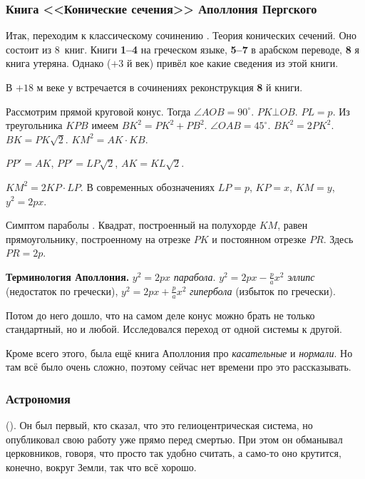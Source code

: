 \documentclass[a4paper,oneside,fleqn,10pt]{article}
\begin{document}
\subsubsection{Книга <<Конические сечения>> Аполлония Пергского}

Итак, переходим к классическому сочинению
. Теория конических сечений.  Оно состоит
из 8~книг. Книги \textbf{1--4} на греческом языке, \textbf{5--7} в
арабском переводе, \textbf{8} я книга утеряна.  Однако 
($+3$ й век) привёл кое какие сведения из этой книги.

В $+18$ м веке у  встречается в сочинениях
реконструкция \textbf{8} й книги.

Рассмотрим прямой круговой конус. Тогда $\angle AOB = 90^\circ$. $PK
\bot OB$. $PL = p$.  Из треугольника $KPB$ имеем $BK^2 = PK^2 + PB^2$.
$\angle OAB = 45^\circ$. $BK^2 = 2PK^2$. $BK = PK\sqrt2$.  $KM^2 =
AK\cdot KB$.


$PP' = AK$, $PP' = LP\sqrt2$, $AK = KL\sqrt2$.

$KM^2 = 2KP\cdot LP$. В современных обозначениях $LP = p$, $KP = x$,
$KM = y$, $y^2 = 2px$.

Симптом параболы .  Квадрат,
построенный на полухорде $KM$, равен прямоугольнику, построенному на
отрезке $PK$ и постоянном отрезке $PR$.  Здесь $PR = 2p$.

\textbf{Терминология Аполлония.}  $y^2 = 2px$ \emph{парабола}.  $y^2 =
2px - \frac pa x^2$ \emph{эллипс} (недостаток по гречески), $y^2 = 2px
+ \frac pa x^2$ \emph{гипербола} (избыток по гречески).

Потом до него дошло, что на самом деле конус можно брать не только
стандартный, но и любой. Исследовался переход от одной системы к
другой.

Кроме всего этого, была ещё книга Аполлония про \emph{касательные} и
\emph{нормали}.  Но там всё было очень сложно, поэтому сейчас нет
времени про это рассказывать.

\subsubsection{Астрономия}

 (). Он был первый, кто сказал, что
это гелиоцентрическая система, но опубликовал свою работу уже прямо
перед смертью.  При этом он обманывал церковников, говоря, что просто
так удобно считать, а само-то оно крутится, конечно, вокруг Земли, так
что всё хорошо.
\end{document}
